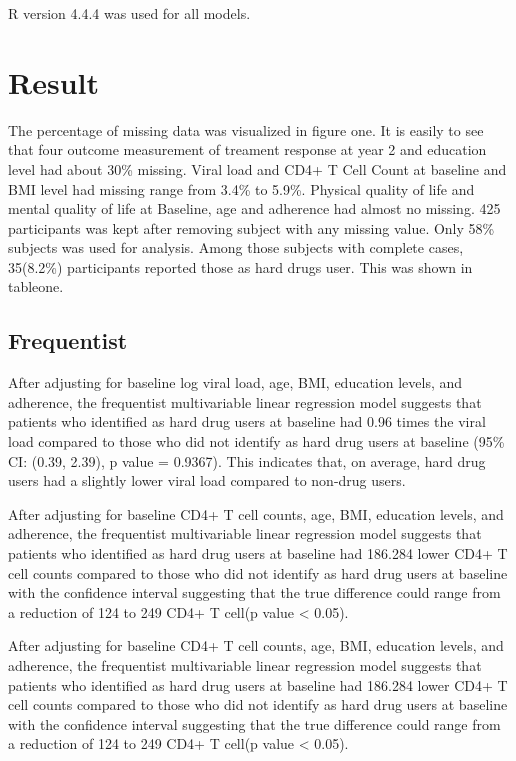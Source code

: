 \documentclass[
  12pt,
]{article}
\begin{document}
R version 4.4.4 was used for all models.

\hypertarget{result}{%
\section{Result}\label{result}}

The percentage of missing data was visualized in figure one. It is
easily to see that four outcome measurement of treament response at year
2 and education level had about 30\% missing. Viral load and CD4+ T Cell
Count at baseline and BMI level had missing range from 3.4\% to 5.9\%.
Physical quality of life and mental quality of life at Baseline, age and
adherence had almost no missing. 425 participants was kept after
removing subject with any missing value. Only 58\% subjects was used for
analysis. Among those subjects with complete cases, 35(8.2\%)
participants reported those as hard drugs user. This was shown in
tableone.

\hypertarget{frequentist}{%
\subsection{Frequentist}\label{frequentist}}

After adjusting for baseline log viral load, age, BMI, education levels,
and adherence, the frequentist multivariable linear regression model
suggests that patients who identified as hard drug users at baseline had
0.96 times the viral load compared to those who did not identify as hard
drug users at baseline (95\% CI: (0.39, 2.39), p value = 0.9367). This
indicates that, on average, hard drug users had a slightly lower viral
load compared to non-drug users.

After adjusting for baseline CD4+ T cell counts, age, BMI, education
levels, and adherence, the frequentist multivariable linear regression
model suggests that patients who identified as hard drug users at
baseline had 186.284 lower CD4+ T cell counts compared to those who did
not identify as hard drug users at baseline with the confidence interval
suggesting that the true difference could range from a reduction of 124
to 249 CD4+ T cell(p value \textless{} 0.05).

After adjusting for baseline CD4+ T cell counts, age, BMI, education
levels, and adherence, the frequentist multivariable linear regression
model suggests that patients who identified as hard drug users at
baseline had 186.284 lower CD4+ T cell counts compared to those who did
not identify as hard drug users at baseline with the confidence interval
suggesting that the true difference could range from a reduction of 124
to 249 CD4+ T cell(p value \textless{} 0.05).
\end{document}
